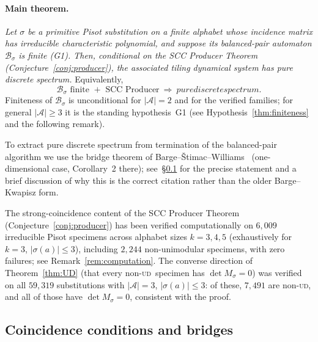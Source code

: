 \documentclass[11pt]{article}
\theoremstyle{plain}
\theoremstyle{definition}
\theoremstyle{remark}
\newcommand{\UD}{\textsc{ud}}
\newcommand{\PDS}{pure discrete spectrum}
\newcommand{\A}{\mathcal{A}}
\newcommand{\B}{\mathcal{B}}
\begin{document}
\paragraph{Main theorem.} \emph{Let $\sigma$ be a primitive Pisot substitution on a finite alphabet whose incidence matrix has irreducible characteristic polynomial, and suppose its balanced-pair automaton $\B_\sigma$ is finite \textup{(G1)}. Then, conditional on the SCC Producer Theorem (Conjecture~\ref{conj:producer}), the associated tiling dynamical system has \PDS.} Equivalently,
\[
\boxed{\;\B_\sigma\text{ finite }+\text{ SCC Producer}\ \Longrightarrow\ \PDS.\;}
\]
Finiteness of $\B_\sigma$ is unconditional for $|\A|=2$ and for the verified families; for general $|\A|\ge3$ it is the standing hypothesis~G1 (see Hypothesis~\ref{thm:finiteness} and the following remark).

To extract \PDS{} from termination of the balanced-pair algorithm we use the bridge theorem of Barge--\v{S}timac--Williams~\cite{BSW} (one-dimensional case, Corollary~2 there); see~\S\ref{sec:bridges} for the precise statement and a brief discussion of why this is the correct citation rather than the older Barge--Kwapisz form.

The strong-coincidence content of the SCC Producer Theorem (Conjecture~\ref{conj:producer}) has been verified computationally on $6{,}009$ irreducible Pisot specimens across alphabet sizes $k=3,4,5$ (exhaustively for $k=3$, $|\sigma(a)|\le 3$), including $2{,}244$ non-unimodular specimens, with zero failures; see Remark~\ref{rem:computation}. The converse direction of Theorem~\ref{thm:UD} (that every non-\UD\ specimen has $\det M_\sigma=0$) was verified on all $59{,}319$ substitutions with $|\A|=3$, $|\sigma(a)|\le 3$: of these, $7{,}491$ are non-\UD, and all of those have $\det M_\sigma=0$, consistent with the proof.

\subsection{Coincidence conditions and bridges}\label{sec:bridges}
\end{document}
